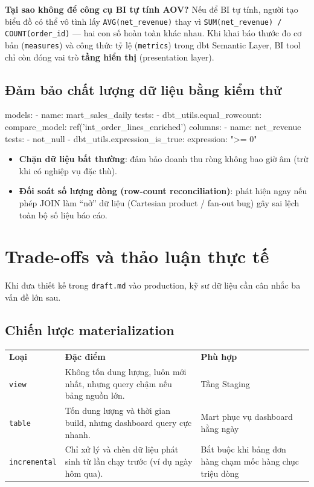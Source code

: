 \documentclass[12pt]{article}
\begin{document}
\textbf{Tại sao không để công cụ BI tự tính AOV?} Nếu để BI tự tính, người tạo biểu đồ có thể vô tình lấy \texttt{AVG(net\_revenue)} thay vì \texttt{SUM(net\_revenue) / COUNT(order\_id)} --- hai con số hoàn toàn khác nhau. Khi khai báo thước đo cơ bản (\texttt{measures}) và công thức tỷ lệ (\texttt{metrics}) trong dbt Semantic Layer, BI tool chỉ còn đóng vai trò \textbf{tầng hiển thị} (presentation layer).

\subsection{Đảm bảo chất lượng dữ liệu bằng kiểm thử}

\begin{aivnplainbox}
models:
  - name: mart_sales_daily
    tests:
      - dbt_utils.equal_rowcount:
          compare_model: ref('int_order_lines_enriched')
    columns:
      - name: net_revenue
        tests:
          - not_null
          - dbt_utils.expression_is_true:
              expression: ">= 0"
\end{aivnplainbox}

\begin{itemize}
    \item \textbf{Chặn dữ liệu bất thường}: đảm bảo doanh thu ròng không bao giờ âm (trừ khi có nghiệp vụ đặc thù).
    \item \textbf{Đối soát số lượng dòng (row-count reconciliation)}: phát hiện ngay nếu phép JOIN làm ``nở'' dữ liệu (Cartesian product / fan-out bug) gây sai lệch toàn bộ số liệu báo cáo.
\end{itemize}

\section{Trade-offs và thảo luận thực tế}

Khi đưa thiết kế trong \texttt{draft.md} vào production, kỹ sư dữ liệu cần cân nhắc ba vấn đề lớn sau.

\subsection{Chiến lược materialization}

\noindent
\begin{longtable}{@{}>{\RaggedRight\arraybackslash}p{2.4cm}>{\RaggedRight\arraybackslash}p{7.2cm}>{\RaggedRight\arraybackslash}p{6.2cm}@{}}
\rowcolor{rowLavender}
\textbf{Loại} & \textbf{Đặc điểm} & \textbf{Phù hợp} \\
\addlinespace[3pt]
\endhead
\texttt{view} & Không tốn dung lượng, luôn mới nhất, nhưng query chậm nếu bảng nguồn lớn. & Tầng Staging \\
\addlinespace[3pt]
\texttt{table} & Tốn dung lượng và thời gian build, nhưng dashboard query cực nhanh. & Mart phục vụ dashboard hằng ngày \\
\addlinespace[3pt]
\texttt{incremental} & Chỉ xử lý và chèn dữ liệu phát sinh từ lần chạy trước (ví dụ ngày hôm qua). & Bắt buộc khi bảng đơn hàng chạm mốc hàng chục triệu dòng \\
\end{longtable}
\end{document}
